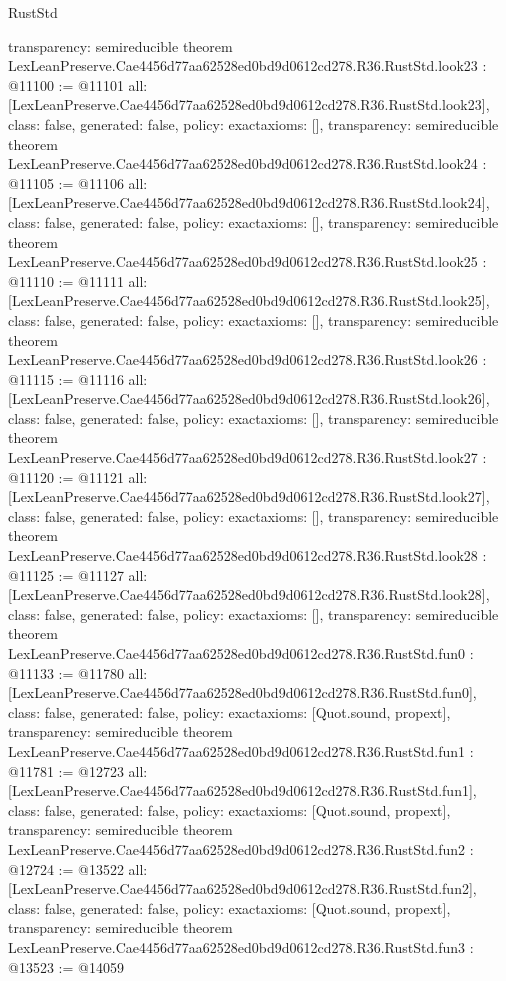 \begin{lexlean}{RustStd}
\begin{coremodule}
{  transparency: semireducible
}
theorem LexLeanPreserve.Cae4456d77aa62528ed0bd9d0612cd278.R36.RustStd.look23 : @11100 := @11101 {
  all: [LexLeanPreserve.Cae4456d77aa62528ed0bd9d0612cd278.R36.RustStd.look23],
  class: false,
  generated: false,
  policy: exact{axioms: []},
  transparency: semireducible
}
theorem LexLeanPreserve.Cae4456d77aa62528ed0bd9d0612cd278.R36.RustStd.look24 : @11105 := @11106 {
  all: [LexLeanPreserve.Cae4456d77aa62528ed0bd9d0612cd278.R36.RustStd.look24],
  class: false,
  generated: false,
  policy: exact{axioms: []},
  transparency: semireducible
}
theorem LexLeanPreserve.Cae4456d77aa62528ed0bd9d0612cd278.R36.RustStd.look25 : @11110 := @11111 {
  all: [LexLeanPreserve.Cae4456d77aa62528ed0bd9d0612cd278.R36.RustStd.look25],
  class: false,
  generated: false,
  policy: exact{axioms: []},
  transparency: semireducible
}
theorem LexLeanPreserve.Cae4456d77aa62528ed0bd9d0612cd278.R36.RustStd.look26 : @11115 := @11116 {
  all: [LexLeanPreserve.Cae4456d77aa62528ed0bd9d0612cd278.R36.RustStd.look26],
  class: false,
  generated: false,
  policy: exact{axioms: []},
  transparency: semireducible
}
theorem LexLeanPreserve.Cae4456d77aa62528ed0bd9d0612cd278.R36.RustStd.look27 : @11120 := @11121 {
  all: [LexLeanPreserve.Cae4456d77aa62528ed0bd9d0612cd278.R36.RustStd.look27],
  class: false,
  generated: false,
  policy: exact{axioms: []},
  transparency: semireducible
}
theorem LexLeanPreserve.Cae4456d77aa62528ed0bd9d0612cd278.R36.RustStd.look28 : @11125 := @11127 {
  all: [LexLeanPreserve.Cae4456d77aa62528ed0bd9d0612cd278.R36.RustStd.look28],
  class: false,
  generated: false,
  policy: exact{axioms: []},
  transparency: semireducible
}
theorem LexLeanPreserve.Cae4456d77aa62528ed0bd9d0612cd278.R36.RustStd.fun0 : @11133 := @11780 {
  all: [LexLeanPreserve.Cae4456d77aa62528ed0bd9d0612cd278.R36.RustStd.fun0],
  class: false,
  generated: false,
  policy: exact{axioms: [Quot.sound, propext]},
  transparency: semireducible
}
theorem LexLeanPreserve.Cae4456d77aa62528ed0bd9d0612cd278.R36.RustStd.fun1 : @11781 := @12723 {
  all: [LexLeanPreserve.Cae4456d77aa62528ed0bd9d0612cd278.R36.RustStd.fun1],
  class: false,
  generated: false,
  policy: exact{axioms: [Quot.sound, propext]},
  transparency: semireducible
}
theorem LexLeanPreserve.Cae4456d77aa62528ed0bd9d0612cd278.R36.RustStd.fun2 : @12724 := @13522 {
  all: [LexLeanPreserve.Cae4456d77aa62528ed0bd9d0612cd278.R36.RustStd.fun2],
  class: false,
  generated: false,
  policy: exact{axioms: [Quot.sound, propext]},
  transparency: semireducible
}
theorem LexLeanPreserve.Cae4456d77aa62528ed0bd9d0612cd278.R36.RustStd.fun3 : @13523 := @14059 {
}
\end{coremodule}
\end{lexlean}
